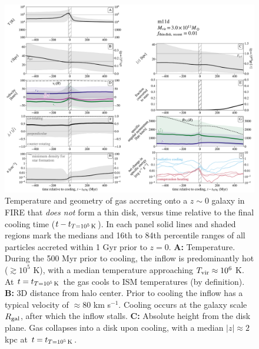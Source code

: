 \documentclass[fleqn,usenatbib]{mnras}
\newcommand{\tcon}{t_{T=10^5\,{\rm K}}}
\newcommand{\Tvir}{T_{\rm vir}}
\begin{document}
\begin{figure}
\includegraphics[width=\textwidth]{figures/before_and_after/before_and_after_allone_m11d_md.pdf}
\caption{
Temperature and geometry of gas accreting onto a $z\sim0$ galaxy in FIRE that {\em does not} form a thin disk, versus time relative to the final cooling time ($t - \tcon$).
In each panel solid lines and shaded regions mark the medians and 16th to 84th percentile ranges of all particles accreted within 1 Gyr prior to $z=0$.
\textbf{A:}
Temperature. During the 500 Myr prior to cooling, the inflow is predominantly hot ($\gtrsim 10^5$ K), with a median temperature approaching $\Tvir\approx10^6$ K. At $t = \tcon$ the gas cools to ISM temperatures (by definition).
\textbf{B:}
3D distance from halo center. Prior to cooling the inflow has a typical velocity of $\approx 80$ km s$^{-1}$. Cooling occurs at the galaxy scale $R_{\rm gal}$, after which the inflow stalls.
\textbf{C:}
Absolute height from the disk plane.
Gas collapses into a disk upon cooling, with a median $\vert z \vert \approx 2$ kpc at $t=\tcon$.
}
\label{f:counterexample}
\end{figure}
\end{document}
